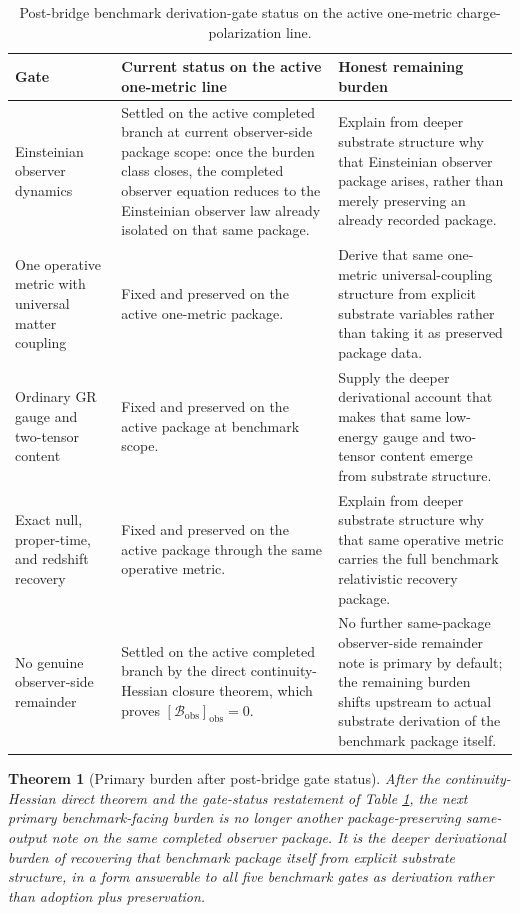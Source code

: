 \documentclass[11pt]{article}
\newcommand{\ObsBurden}{\mathcal{B}_{\mathrm{obs}}}
\newcommand{\ObserverClass}[1]{\left[#1\right]_{\mathrm{obs}}}
\newtheorem{theorem}{Theorem}
\begin{document}
\begin{table}[ht]
\centering
\renewcommand{\arraystretch}{1.2}
\begin{tabular}{>{\raggedright\arraybackslash}p{} >{\raggedright\arraybackslash}p{} >{\raggedright\arraybackslash}p{}}
\toprule
\textbf{Gate} & \textbf{Current status on the active one-metric line} & \textbf{Honest remaining burden} \\
\midrule
Einsteinian observer dynamics & Settled on the active completed branch at current observer-side package scope: once the burden class closes, the completed observer equation reduces to the Einsteinian observer law already isolated on that same package. & Explain from deeper substrate structure why that Einsteinian observer package arises, rather than merely preserving an already recorded package. \\
One operative metric with universal matter coupling & Fixed and preserved on the active one-metric package. & Derive that same one-metric universal-coupling structure from explicit substrate variables rather than taking it as preserved package data. \\
Ordinary GR gauge and two-tensor content & Fixed and preserved on the active package at benchmark scope. & Supply the deeper derivational account that makes that same low-energy gauge and two-tensor content emerge from substrate structure. \\
Exact null, proper-time, and redshift recovery & Fixed and preserved on the active package through the same operative metric. & Explain from deeper substrate structure why that same operative metric carries the full benchmark relativistic recovery package. \\
No genuine observer-side remainder & Settled on the active completed branch by the direct continuity-Hessian closure theorem, which proves \(\ObserverClass{\ObsBurden}=0\). & No further same-package observer-side remainder note is primary by default; the remaining burden shifts upstream to actual substrate derivation of the benchmark package itself. \\
\bottomrule
\end{tabular}
\caption{Post-bridge benchmark derivation-gate status on the active one-metric charge-polarization line.}
\label{tab:gates}
\end{table}

\begin{theorem}[Primary burden after post-bridge gate status]
After the continuity-Hessian direct theorem and the gate-status restatement of Table \ref{tab:gates}, the next primary benchmark-facing burden is no longer another package-preserving same-output note on the same completed observer package. It is the deeper derivational burden of recovering that benchmark package itself from explicit substrate structure, in a form answerable to all five benchmark gates as derivation rather than adoption plus preservation.
\end{theorem}
\end{document}
